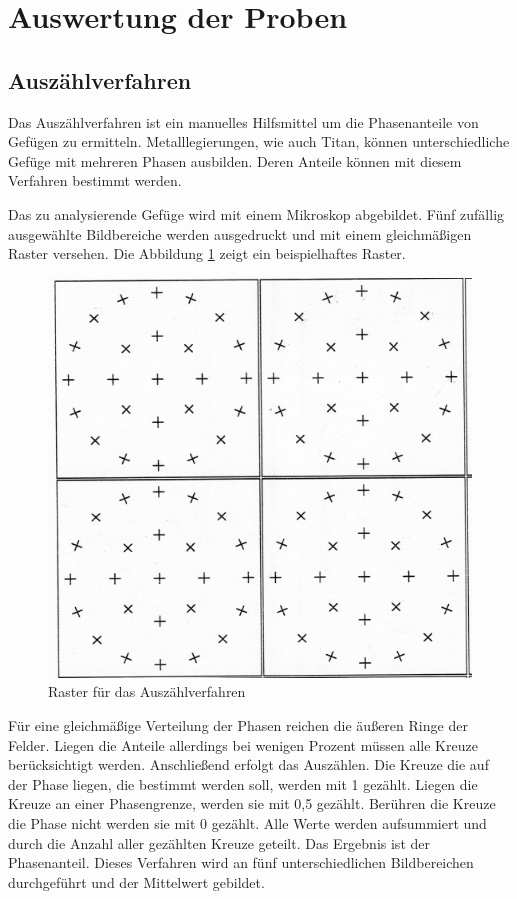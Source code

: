 \documentclass[a4paper, 11pt]{tubsreprt}
\begin{document}
\section{Auswertung der Proben}
\subsection{Auszählverfahren}
Das Auszählverfahren ist ein manuelles Hilfsmittel um die Phasenanteile von Gefügen zu ermitteln. Metalllegierungen, wie auch Titan, können unterschiedliche Gefüge mit mehreren Phasen ausbilden. Deren Anteile können mit diesem Verfahren bestimmt werden.

Das zu analysierende Gefüge wird mit einem Mikroskop abgebildet. Fünf zufällig ausgewählte Bildbereiche werden ausgedruckt und mit einem gleichmäßigen Raster versehen. Die Abbildung \ref{Raster für das Auszählverfahren} zeigt ein beispielhaftes Raster.
\begin{figure} %
\centering
\includegraphics[scale=1]{Bilder/Raster.png}
\caption{Raster für das Auszählverfahren}
\label{Raster für das Auszählverfahren}
\end{figure}

Für eine gleichmäßige Verteilung der Phasen reichen die äußeren Ringe der Felder. Liegen die Anteile allerdings bei wenigen Prozent müssen alle Kreuze berücksichtigt werden. 
Anschließend erfolgt das Auszählen. Die Kreuze die auf der Phase liegen, die bestimmt werden soll, werden mit 1 gezählt. Liegen die Kreuze an einer Phasengrenze, werden sie mit 0,5 gezählt. Berühren die Kreuze die Phase nicht werden sie mit 0 gezählt. Alle Werte werden aufsummiert und durch die Anzahl aller gezählten Kreuze geteilt. Das Ergebnis ist der Phasenanteil. Dieses Verfahren wird an fünf unterschiedlichen Bildbereichen durchgeführt und der Mittelwert gebildet.
\end{document}

